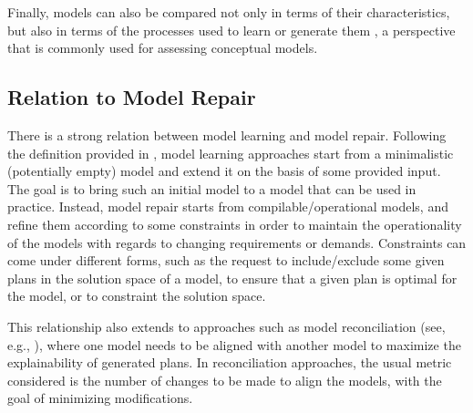 \documentclass{article}
\theoremstyle{definition}
\theoremstyle{remark}
\newif\ifaddcomments
\newcommand{\roni}[1]{\ifaddcomments{\textcolor{red}{[Roni: #1]}}\fi}
\begin{document}
Finally, models can also be compared not only in terms of their characteristics, but also in terms of the processes used to learn or generate them \citep{vallati2021quality}, a perspective that is commonly used for assessing conceptual models.




\subsection{Relation to Model Repair}
There is a strong relation between model learning and model repair. Following the definition provided in \cite{ace58d7c61b44f7eac8ee226d89e2153}, model learning approaches start from a minimalistic (potentially empty) model and extend it on the basis of some provided input. The goal is to bring such an initial model to a model that can be used in practice. Instead, model repair starts from compilable/operational models, and refine them according to some constraints in order to maintain the operationality of the models with regards to changing requirements or demands. Constraints can come under different forms, such as the request to include/exclude some given plans in the solution space of a model, to ensure that a given plan is optimal for the model, or to constraint the solution space. 

This relationship also extends to approaches such as model reconciliation (see, e.g., \citep{ChakrabortiSZK17,SreedharanHMK19}), where one model needs to be aligned with another model to maximize the explainability of generated plans. In reconciliation approaches, the usual metric considered is the number of changes to be made to align the models, with the goal of minimizing modifications.

\end{document}
